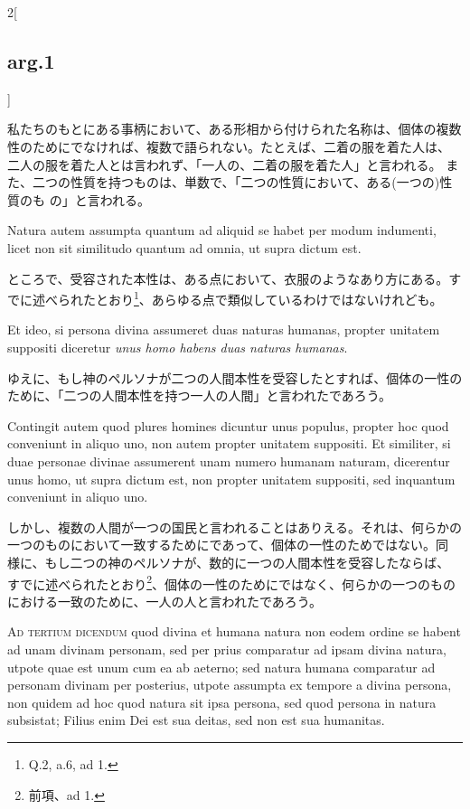 \documentclass[paper=a4paper,fontsize=10pt,jafontsize=9pt,titlepage]{jlreq}
\begin{document}
\begin{paracol}{2}[\subsection{arg.1}]
\switchcolumn

私たちのもとにある事柄において、ある形相から付けられた名称は、個体の複数
 性のためにでなければ、複数で語られない。たとえば、二着の服を着た人は、
 二人の服を着た人とは言われず、「一人の、二着の服を着た人」と言われる。
 また、二つの性質を持つものは、単数で、「二つの性質において、ある(一つの)性質のも
 の」と言われる。

\switchcolumn*

Natura autem assumpta quantum ad aliquid se habet per modum
indumenti, licet non sit similitudo quantum ad omnia, ut supra dictum
est.

\switchcolumn

ところで、受容された本性は、ある点において、衣服のようなあり方にある。す
 でに述べられたとおり\footnote{Q.2, a.6, ad 1.}、あらゆる点で類似しているわけではないけれども。

\switchcolumn*

Et ideo, si persona divina assumeret duas naturas humanas, propter
unitatem suppositi diceretur {\itshape unus homo habens duas naturas
humanas}.

\switchcolumn

ゆえに、もし神のペルソナが二つの人間本性を受容したとすれば、個体の一性の
 ために、「二つの人間本性を持つ一人の人間」と言われたであろう。

\switchcolumn*

Contingit autem quod plures homines dicuntur unus populus,
propter hoc quod conveniunt in aliquo uno, non autem propter unitatem
suppositi. Et similiter, si duae personae divinae assumerent unam numero
humanam naturam, dicerentur unus homo, ut supra dictum est, non propter
unitatem suppositi, sed inquantum conveniunt in aliquo uno.

\switchcolumn

しかし、複数の人間が一つの国民と言われることはありえる。それは、何らかの
 一つのものにおいて一致するためにであって、個体の一性のためではない。同
 様に、もし二つの神のペルソナが、数的に一つの人間本性を受容したならば、
 すでに述べられたとおり\footnote{前項、ad 1.}、個体の一性のためにではなく、何らかの一つのもの
 における一致のために、一人の人と言われたであろう。

\switchcolumn*[\subsection{ad.3}]

{\scshape Ad tertium dicendum} quod divina et humana natura non eodem ordine se
habent ad unam divinam personam, sed per prius comparatur ad ipsam
divina natura, utpote quae est unum cum ea ab aeterno; sed natura humana
comparatur ad personam divinam per posterius, utpote assumpta ex tempore
a divina persona, non quidem ad hoc quod natura sit ipsa persona, sed
quod persona in natura subsistat; Filius enim Dei est sua deitas, sed non
est sua humanitas.


\end{paracol}
\end{document}
